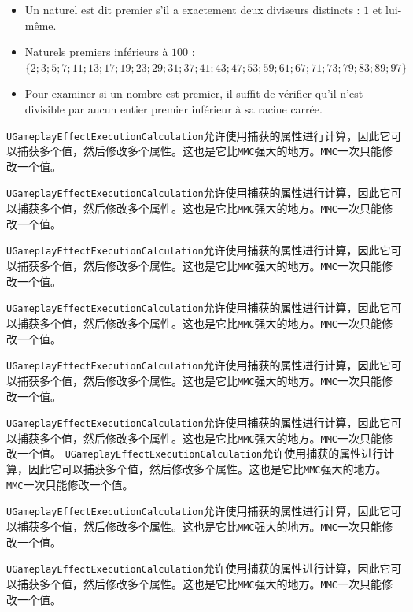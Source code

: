 \documentclass[10pt,a4paper,x11names,dvipsnames,svgnames,oneside]{ctexbook}
\begin{document}
	\begin{df}%
	\begin{itemize}
		\item Un naturel est dit premier s'il a exactement deux diviseurs distincts : $1$ et lui-même. 
		\item Naturels premiers inférieurs à $100$ : \\
		$\{2;3 ;5 ;7 ;11 ;13 ;17 ;19 ;23 ;29 ;31 ;37 ;41 ;43 ;47 ;53 ;59 ;61 ;67 ;71 ;73 ;79 ;83 ;89 ;97\}$ 
		\item Pour  examiner  si  un  nombre est  premier,  il suffit  de vérifier qu'il  n'est divisible par aucun entier premier inférieur à sa racine carrée. 
	\end{itemize}
	\texttt{UGameplayEffectExecutionCalculation}允许使用捕获的属性进行计算，因此它可以捕获多个值，然后修改多个属性。这也是它比\texttt{MMC}强大的地方。\texttt{MMC}一次只能修改一个值。
	
	
	\texttt{UGameplayEffectExecutionCalculation}允许使用捕获的属性进行计算，因此它可以捕获多个值，然后修改多个属性。这也是它比\texttt{MMC}强大的地方。\texttt{MMC}一次只能修改一个值。
	
	
	\texttt{UGameplayEffectExecutionCalculation}允许使用捕获的属性进行计算，因此它可以捕获多个值，然后修改多个属性。这也是它比\texttt{MMC}强大的地方。\texttt{MMC}一次只能修改一个值。
	
	
	\texttt{UGameplayEffectExecutionCalculation}允许使用捕获的属性进行计算，因此它可以捕获多个值，然后修改多个属性。这也是它比\texttt{MMC}强大的地方。\texttt{MMC}一次只能修改一个值。
	
	
	\texttt{UGameplayEffectExecutionCalculation}允许使用捕获的属性进行计算，因此它可以捕获多个值，然后修改多个属性。这也是它比\texttt{MMC}强大的地方。\texttt{MMC}一次只能修改一个值。
	
	
	\texttt{UGameplayEffectExecutionCalculation}允许使用捕获的属性进行计算，因此它可以捕获多个值，然后修改多个属性。这也是它比\texttt{MMC}强大的地方。\texttt{MMC}一次只能修改一个值。	
	\texttt{UGameplayEffectExecutionCalculation}允许使用捕获的属性进行计算，因此它可以捕获多个值，然后修改多个属性。这也是它比\texttt{MMC}强大的地方。\texttt{MMC}一次只能修改一个值。
	
	
	\texttt{UGameplayEffectExecutionCalculation}允许使用捕获的属性进行计算，因此它可以捕获多个值，然后修改多个属性。这也是它比\texttt{MMC}强大的地方。\texttt{MMC}一次只能修改一个值。
	
	
	\texttt{UGameplayEffectExecutionCalculation}允许使用捕获的属性进行计算，因此它可以捕获多个值，然后修改多个属性。这也是它比\texttt{MMC}强大的地方。\texttt{MMC}一次只能修改一个值。
	

\end{df}
\end{document}
